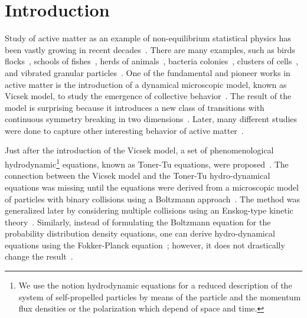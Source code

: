 \documentclass[reprint,floatfix,amsmath,amssymb,aps,pre,showkeys,showpacs,superscriptaddress]{revtex4-1}
\begin{document}
\section{Introduction}

Study of active matter as an example of non-equilibrium statistical physics has been vastly growing in recent decades~\cite{marchetti,Vicsek2012,Redner2013structure,cates2014,caussin2014,Weber2015random,Solon2015,Ginot2015nonequilibrium,Battle2016broken,Menzel2016on}. There are many examples, such as birds flocks~\cite{Biro2006,Nagy2010,Attanasi2014information,Cavagna2015silent,Cavagna2015flocking}, schools of fishes~\cite{Makris2006,Becco2006,Lopez2012from}, herds of animals~\cite{ginelli2015,toulet2015}, bacteria colonies~\cite{Dombrowski2004self,Sokolov2007concentration,peruani2012}, clusters of cells~\cite{Segerer2015emergence}, and vibrated granular particles~\cite{Narayan2007,kumar2014flocking}. One of the  fundamental and pioneer works in active matter is the introduction of a dynamical microscopic model, known as Vicsek model, to study the emergence of collective behavior~\cite{Vicsek1995}. The result of the model is surprising because it introduces a new class of transitions with continuous symmetry breaking in two dimensions~\cite{chepizhko2013,weitz2015}. Later, many different studies were done to capture other interesting behavior of active matter~\cite{Vicsek1995,Shimoyama1996,Czirok1997,Chate2008a, Peruani2011polar,Farrell2012,solon2013,Weber2014defect,Fily2015dynamics,Bratanov2015new,Chepizhko2015active,nagia2015collective,Grossmann2016superdiffusion,denk2016active}.




Just after the introduction of the Vicsek model, a set of phenomenological hydrodynamic\footnote{We use the notion hydrodynamic equations for a reduced description of the system of self-propelled particles by means of the particle and the momentum flux densities or  the polarization which depend of space and time.} equations,  known as Toner-Tu equations, were proposed~\cite{Toner1995}. The connection between the Vicsek model and the Toner-Tu hydro-dynamical equations was missing until the equations were derived from a microscopic model of particles with binary collisions using a Boltzmann approach~\cite{Bertin2006,Bertin2009,Peshkov2012,Peshkov2012continuous}. The method was generalized later by considering multiple collisions using an Enskog-type kinetic theory~\cite{ihle2011kinetic,Chou2012kinetic,Ihle2014toward,Ihle2015large}. Similarly, instead of formulating the Boltzmann equation for the probability distribution density equations, one can derive hydro-dynamical equations using the Fokker-Planck equation~\cite{Baskaran2008,Farrell2012,Grossmann2013}; however, it does not drastically change the result~\cite{Bertin2015}.
\end{document}
